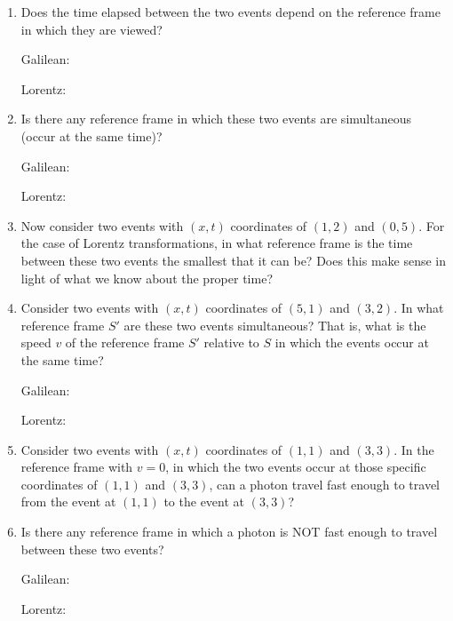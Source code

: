 \begin{enumerate}
\item Does the time elapsed between the two events depend on the reference frame in which they are viewed?  

\bigskip
\hspace{0.5in}Galilean:

\bigskip
\hspace{0.5in}Lorentz:
\answerspace{0.5in}

\item Is there any reference frame in which these two events are simultaneous (occur at the same time)?  

\bigskip
\hspace{0.5in}Galilean:

\bigskip
\hspace{0.5in}Lorentz:
\answerspace{0.5in}

\item Now consider two events with $(x,t)$ coordinates of $(1,2)$ and $(0,5)$. 
For the case of Lorentz transformations, in what reference frame is the time between these two events the smallest that it can be?  Does this make sense in light of what we know about the proper time?
\answerspace{0.7in}


\item Consider two events with $(x,t)$ coordinates of $(5,1)$ and $(3,2)$. In what reference frame $S'$ are these two events simultaneous? That is, what is the speed $v$ of the reference frame $S'$ relative to $S$ in which the events occur at the same time?

\bigskip
\hspace{0.5in}Galilean:

\bigskip
\hspace{0.5in}Lorentz:
\answerspace{0.5in}

\item Consider two events with $(x,t)$ coordinates of $(1,1)$ and $(3,3)$. In the reference frame with $v=0$, in which the two events occur at those specific coordinates of $(1,1)$ and $(3,3)$, can a photon travel fast enough to travel from the event at $(1,1)$ to the event at $(3,3)$? 

\answerspace{0.7in}

\item Is there any reference frame in which a photon is NOT fast enough to travel between these two events?

\bigskip
\hspace{0.5in}Galilean:

\bigskip
\hspace{0.5in}Lorentz:
\answerspace{0.5in}

\end{enumerate}
